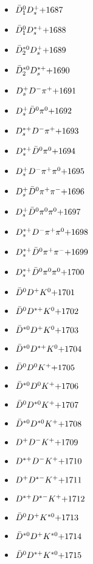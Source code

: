 \begin{multicols}{3}
\begin{itemize}
 \item $ \bar{D}_{1}^{0} D_{s}^{+} \hfill{+1687}$
 \item $ \bar{D}_{1}^{0} D_{s}^{*+} \hfill{+1688}$
 \item $ \bar{D}_{2}^{*0} D_{s}^{+} \hfill{+1689}$
 \item $ \bar{D}_{2}^{*0} D_{s}^{*+} \hfill{+1690}$
 \item $ D_{s}^{+} D^{-} \pi^{+} \hfill{+1691}$
 \item $ D_{s}^{+} \bar{D}^{0} \pi^{0} \hfill{+1692}$
 \item $ D_{s}^{*+} D^{-} \pi^{+} \hfill{+1693}$
 \item $ D_{s}^{*+} \bar{D}^{0} \pi^{0} \hfill{+1694}$
 \item $ D_{s}^{+} D^{-} \pi^{+} \pi^{0} \hfill{+1695}$
 \item $ D_{s}^{+} \bar{D}^{0} \pi^{+} \pi^{-} \hfill{+1696}$
 \item $ D_{s}^{+} \bar{D}^{0} \pi^{0} \pi^{0} \hfill{+1697}$
 \item $ D_{s}^{*+} D^{-} \pi^{+} \pi^{0} \hfill{+1698}$
 \item $ D_{s}^{*+} \bar{D}^{0} \pi^{+} \pi^{-} \hfill{+1699}$
 \item $ D_{s}^{*+} \bar{D}^{0} \pi^{0} \pi^{0} \hfill{+1700}$
 \item $ \bar{D}^{0} D^{+} K^{0} \hfill{+1701}$
 \item $ \bar{D}^{0} D^{*+} K^{0} \hfill{+1702}$
 \item $ \bar{D}^{*0} D^{+} K^{0} \hfill{+1703}$
 \item $ \bar{D}^{*0} D^{*+} K^{0} \hfill{+1704}$
 \item $ \bar{D}^{0} D^{0} K^{+} \hfill{+1705}$
 \item $ \bar{D}^{*0} D^{0} K^{+} \hfill{+1706}$
 \item $ \bar{D}^{0} D^{*0} K^{+} \hfill{+1707}$
 \item $ \bar{D}^{*0} D^{*0} K^{+} \hfill{+1708}$
 \item $ D^{+} D^{-} K^{+} \hfill{+1709}$
 \item $ D^{*+} D^{-} K^{+} \hfill{+1710}$
 \item $ D^{+} D^{*-} K^{+} \hfill{+1711}$
 \item $ D^{*+} D^{*-} K^{+} \hfill{+1712}$
 \item $ \bar{D}^{0} D^{+} K^{*0} \hfill{+1713}$
 \item $ \bar{D}^{*0} D^{+} K^{*0} \hfill{+1714}$
 \item $ \bar{D}^{0} D^{*+} K^{*0} \hfill{+1715}$

\end{itemize}
\end{multicols}
